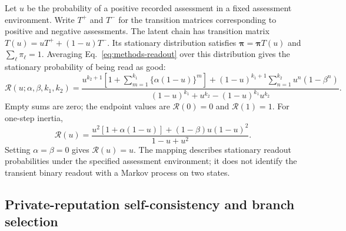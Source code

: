 \documentclass[fleqn,10pt]{article}
\begin{document}
Let $u$ be the probability of a positive recorded assessment in a fixed assessment environment. Write $T^+$ and $T^-$ for the transition matrices corresponding to positive and negative assessments. The latent chain has transition matrix $T(u)=uT^++(1-u)T^-$. Its stationary distribution satisfies $\boldsymbol\pi=\boldsymbol\pi T(u)$ and $\sum_\ell\pi_\ell=1$. Averaging Eq.~\eqref{eq:methods-readout} over this distribution gives the stationary probability of being read as good:
\begin{equation}
\mathcal R(u;\alpha,\beta,k_1,k_2)=
\frac{
u^{k_2+1}\!\left[1+\sum_{m=1}^{k_1}\{\alpha(1-u)\}^{m}\right]
+(1-u)^{k_1+1}\!\sum_{n=1}^{k_2}u^n(1-\beta^n)
}{(1-u)^{k_1}+u^{k_2}-(1-u)^{k_1}u^{k_2}}.
\label{eq:methods-reputation-map}
\end{equation}
Empty sums are zero; the endpoint values are $\mathcal R(0)=0$ and $\mathcal R(1)=1$. For one-step inertia,
\begin{equation}
\mathcal R(u)=
\frac{u^2[1+\alpha(1-u)]+(1-\beta)u(1-u)^2}
{1-u+u^2}.
\label{eq:methods-one-step-map}
\end{equation}
Setting $\alpha=\beta=0$ gives $\mathcal R(u)=u$. The mapping describes stationary readout probabilities under the specified assessment environment; it does not identify the transient binary readout with a Markov process on two states.

\subsection*{Private-reputation self-consistency and branch selection}
\end{document}

